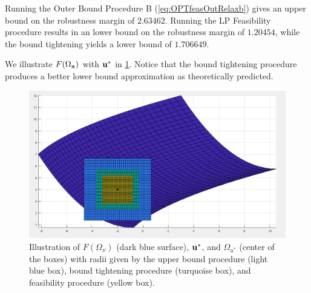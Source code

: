 Running the Outer Bound Procedure B (\cref{eq:OPTfeasOutRelaxb}) gives an upper bound on the robustness margin of $2.63462$.
Running the LP Feasibility procedure results in an lower bound on the robustness margin of $1.20454$, while the bound tightening yields a lower bound of $1.706649$. 

We illustrate $F(\Omega_{\mathbf{x}})$ with $\mathbf{u}^*$ in \cref{fig:FOmega}.
Notice that the bound tightening procedure produces a better lower bound approximation as theoretically predicted.

\begin{figure}[htp!]
  \begin{center}
    \includegraphics[scale=0.45]{Figures/newex} %
  \end{center}
  \caption{\label{fig:FOmega}
    Illustration of $F(\Omega_x)$ (dark blue surface), $\mathbf{u}^*$, and $\Omega_{u^*}$ (center of the boxes) with radii given by the upper bound procedure (light blue box), bound tightening procedure (turquoise box), and feasibility procedure (yellow box).
  }
\end{figure}


